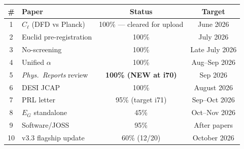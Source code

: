 \documentclass[11pt,a4paper]{article}
\begin{document}
\begin{center}
\begin{tabular}{clcc}
\toprule
\textbf{\#} & \textbf{Paper} & \textbf{Status} & \textbf{Target} \\
\midrule
1 & $C_\ell$ (DFD vs Planck) & 100\% --- cleared for upload & June 2026 \\
2 & Euclid pre-registration & 100\% & July 2026 \\
3 & No-screening & 100\% & Late July 2026 \\
4 & Unified $\alpha$ & 100\% & Aug--Sep 2026 \\
5 & \textit{Phys.\ Reports} review & \textbf{100\% (NEW at i70)} & Sep 2026 \\
6 & DESI JCAP & 100\% & August 2026 \\
7 & PRL letter & 95\% (target i71) & Sep--Oct 2026 \\
8 & $E_G$ standalone & 45\% & Oct--Nov 2026 \\
9 & Software/JOSS & 95\% & After papers \\
10 & v3.3 flagship update & 60\% (12/20) & October 2026 \\
\bottomrule
\end{tabular}
\end{center}
\end{document}
